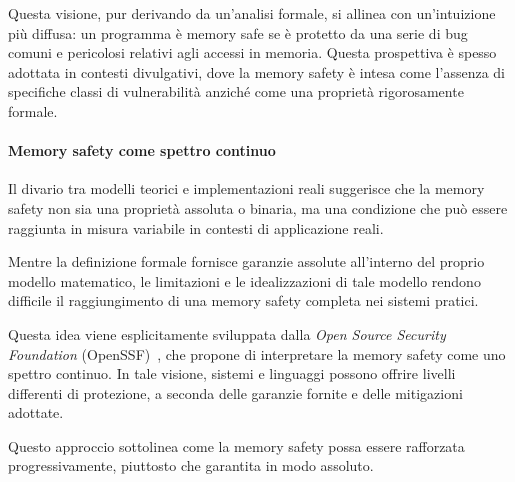 Questa visione, pur derivando da un'analisi formale, si allinea con un'intuizione
più diffusa: un programma è memory safe se è protetto da una serie di bug comuni
e pericolosi relativi agli accessi in memoria. Questa prospettiva è spesso
adottata in contesti divulgativi, dove la memory safety è intesa come l'assenza di
specifiche classi di vulnerabilità anziché come una proprietà rigorosamente formale.

\paragraph{Memory safety come spettro continuo}

Il divario tra modelli teorici e implementazioni reali suggerisce che la memory safety
non sia una proprietà assoluta o binaria, ma una condizione che può essere
raggiunta in misura variabile in contesti di applicazione reali.

Mentre la definizione formale fornisce garanzie assolute all'interno del proprio
modello matematico, le limitazioni e le idealizzazioni di tale modello rendono difficile
il raggiungimento di una memory safety completa nei sistemi pratici.

Questa idea viene esplicitamente sviluppata dalla \textit{Open Source Security
Foundation} (OpenSSF)~\cite{memory_safety_continuum}, che propone di interpretare
la memory safety come uno spettro continuo. In tale visione, sistemi e linguaggi
possono offrire livelli differenti di protezione, a seconda delle garanzie
fornite e delle mitigazioni adottate.

Questo approccio sottolinea come la memory safety possa essere rafforzata
progressivamente, piuttosto che garantita in modo assoluto.
